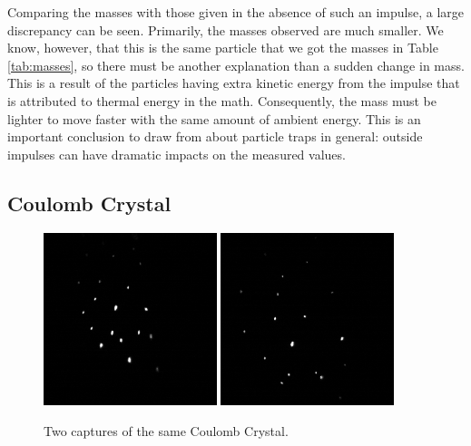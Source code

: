 \documentclass[12pt]{article}
\begin{document}
Comparing the masses with those given in the absence of such an impulse, a large discrepancy can be seen. Primarily, the masses observed are much smaller. We know, however, that this is the same particle that we got the masses in Table \ref{tab:masses}, so there must be another explanation than a sudden change in mass. This is a result of the particles having extra kinetic energy from the impulse that is attributed to thermal energy in the math. Consequently, the mass must be lighter to move faster with the same amount of ambient energy. This is an important conclusion to draw from about particle traps in general: outside impulses can have dramatic impacts on the measured values. 

\subsection{Coulomb Crystal}
\begin{figure}[!ht]
\centering
    \includegraphics[width=0.45\textwidth]{crystal_1.PNG}
    \includegraphics[width=0.45\textwidth]{crystal_2.PNG}
	\caption{Two captures of the same Coulomb Crystal.}
    \label{fig:crystals}
\end{figure}
\end{document}
